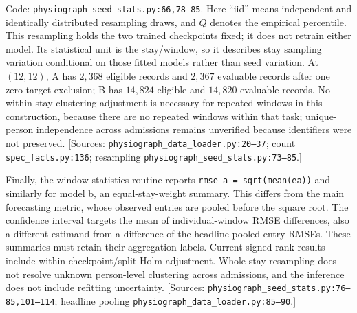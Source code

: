Code: \texttt{physiograph\_\allowbreak{}seed\_\allowbreak{}stats.\allowbreak{}py:\allowbreak{}66,\allowbreak{}78–\allowbreak{}85}. Here “iid” means independent and identically distributed resampling draws, and \(Q\) denotes the empirical percentile. This resampling holds the two trained checkpoints fixed; it does not retrain either model. Its statistical unit is the stay/window, so it describes stay sampling variation conditional on those fitted models rather than seed variation. At \((12,12)\), A has $2{,}368$ eligible records and $2{,}367$ evaluable records after one zero-target exclusion; B has $14{,}824$ eligible and $14{,}820$ evaluable records. No within-stay clustering adjustment is necessary for repeated windows in this construction, because there are no repeated windows within that task; unique-person independence across admissions remains unverified because identifiers were not preserved. [Sources: \texttt{physiograph\_\allowbreak{}data\_\allowbreak{}loader.\allowbreak{}py:\allowbreak{}20–\allowbreak{}37}; count \texttt{spec\_\allowbreak{}facts.\allowbreak{}py:\allowbreak{}136}; resampling \texttt{physiograph\_\allowbreak{}seed\_\allowbreak{}stats.\allowbreak{}py:\allowbreak{}73–\allowbreak{}85}.]

Finally, the window-statistics routine reports \texttt{rmse\_\allowbreak{}a =\allowbreak{} sqrt(mean(ea))} and similarly for model b, an equal-stay-weight summary. This differs from the main forecasting metric, whose observed entries are pooled before the square root. The confidence interval targets the mean of individual-window RMSE differences, also a different estimand from a difference of the headline pooled-entry RMSEs. These summaries must retain their aggregation labels. Current signed-rank results include within-checkpoint/split Holm adjustment. Whole-stay resampling does not resolve unknown person-level clustering across admissions, and the inference does not include refitting uncertainty. [Sources: \texttt{physiograph\_\allowbreak{}seed\_\allowbreak{}stats.\allowbreak{}py:\allowbreak{}76–\allowbreak{}85,\allowbreak{}101–\allowbreak{}114}; headline pooling \texttt{physiograph\_\allowbreak{}data\_\allowbreak{}loader.\allowbreak{}py:\allowbreak{}85–\allowbreak{}90}.]
\clearpage
